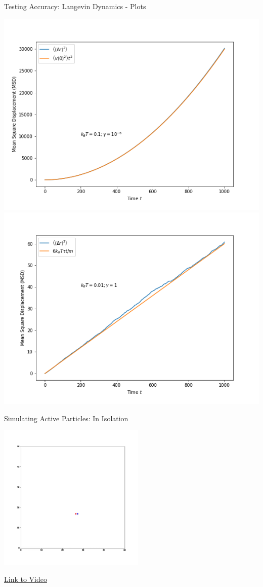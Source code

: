 \documentclass[10pt]{beamer}
\begin{document}
\begin{frame}[label={sec:org1653e6b}]{Testing Accuracy: Langevin Dynamics - Plots}
\begin{center}
\includegraphics[height=4cm\textwidth]{./Lang1.png}
\includegraphics[height=4cm\textwidth]{./Lang2.png}
\end{center}
\end{frame}

\begin{frame}[label={sec:orgd52ab97}]{Simulating Active Particles: In Isolation}
\begin{center}
\includegraphics[height=7cm]{./Active1.png}
\end{center}

\href{./Active1.mp4}{Link to Video}
\end{frame}
\end{document}
